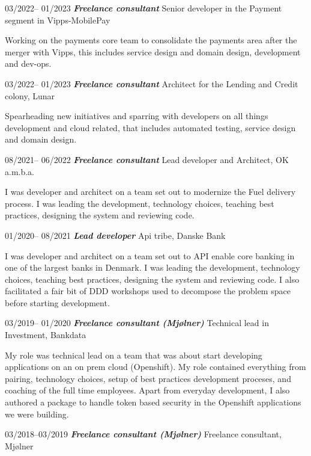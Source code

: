 \documentclass[10pt,a4,sans]{article}
\begin{document}
\begin{CV}
    \item[03/2022-- 01/2023] \textbf{\emph{Freelance consultant}} Senior developer in the Payment segment in Vipps-MobilePay

Working on the payments core team to consolidate the payments area after the merger with Vipps, this includes service design and domain design, development and dev-ops.

    \item[03/2022-- 01/2023] \textbf{\emph{Freelance consultant}} Architect for the Lending and Credit colony, Lunar

Spearheading new initiatives and sparring with developers on all things development and cloud related, that includes automated testing, service design and domain design.

    \item[08/2021-- 06/2022] \textbf{\emph{Freelance consultant}} Lead developer and Architect, OK a.m.b.a.

I was developer and architect on a team set out to modernize the Fuel delivery process. I was leading the development, technology choices, teaching best practices, designing the system and reviewing code.      

    \item[01/2020-- 08/2021] \textbf{\emph{Lead developer}} Api tribe, Danske Bank

I was developer and architect on a team set out to API enable core banking in one of the largest banks in Denmark. I was leading the development, technology choices, teaching best practices, designing the system and reviewing code. I also facilitated a fair bit of DDD workshops used to decompose the problem space before starting development.

    \item[03/2019-- 01/2020] \textbf{\emph{Freelance consultant (Mjølner)}} Technical lead in Investment, Bankdata
    
My role was technical lead on a team that was about start developing applications on an on prem cloud (Openshift). My role contained everything from pairing, technology choices, setup of best practices development proceses, and coaching of the full time employees. Apart from everyday development, I also authored a package to handle token based security in the Openshift applications we were building.

    \item[03/2018--03/2019] \textbf{\emph{Freelance consultant (Mjølner)}} Freelance consultant, Mjølner
    

\end{CV}
\end{document}
